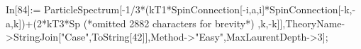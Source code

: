 In[84]:= ParticleSpectrum[-1/3*(kT1*SpinConnection[-i,a,i]*SpinConnection[-k,-a,k])+(2*kT3*Sp (*omitted 2882 characters for brevity*) ,k,-k]],TheoryName->StringJoin["Case",ToString[42]],Method->"Easy",MaxLaurentDepth->3];